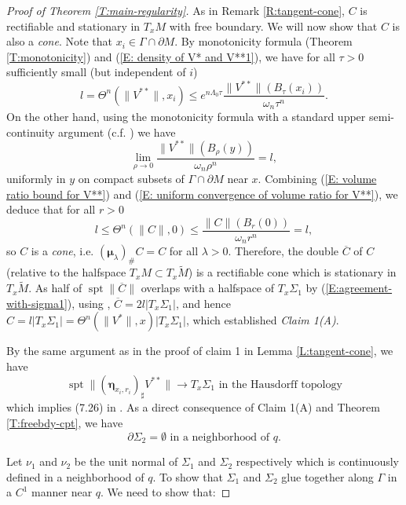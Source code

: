 \documentclass[10pt]{amsart}
\theoremstyle{definition}
\theoremstyle{remark}
\numberwithin{equation}{section}
\newcommand{\A}{\mathcal{A}}
\newcommand{\la}{\lambda}
\newcommand{\La}{\Lambda}
\newcommand{\Si}{\Sigma}
\newcommand{\om}{\omega}
\newcommand{\bmu}{\boldsymbol \mu}
\newcommand{\bleta}{\boldsymbol \eta}
\newcommand{\tM}{\widetilde{M}}
\newcommand{\spt}{\operatorname{spt}}
\begin{document}
\begin{proof}[Proof of Theorem \ref{T:main-regularity}]
As in Remark \ref{R:tangent-cone}, $C$ is rectifiable and stationary in $T_x M$ with free boundary. We will now show that $C$ is also a \emph{cone}. Note that $x_i \in \Gamma \cap \partial M$. By monotonicity formula (Theorem \ref{T:monotonicity}) and (\ref{E: density of V* and V**1}), we have for all $\tau>0$ sufficiently small (but independent of $i$)
\begin{equation}
\label{E: volume ratio bound for V**}
l=\Theta^n(\|V^{**}\|, x_i)\leq e^{n\La_0 \tau}\frac{\|V^{**}\|(B_\tau(x_i))}{\om_n \tau^n}.  
\end{equation}
On the other hand, using the monotonicity formula with a standard upper semi-continuity argument (c.f. \cite[40.6]{Simon}) we have 
\begin{equation}
\label{E: uniform convergence of volume ratio for V**}
\lim_{\rho\to 0} \frac{\|V^{**}\|(B_\rho(y))}{\om_n \rho^n}=l,
\end{equation}
uniformly in $y$ on compact subsets of $\Gamma\cap \partial M$ near $x$.
Combining (\ref{E: volume ratio bound for V**}) and (\ref{E: uniform convergence of volume ratio for V**}), we deduce that for all $r>0$
\[ l\leq \Theta^n(\|C\|, 0)\leq \frac{\|C\|(B_r(0))}{\om_n r^n}=l, \]
so $C$ is a \emph{cone}, i.e. $(\bmu_{\la})_{\#} C= C$ for all $\la>0$. Therefore, the double $\overline{C}$ of $C$ (relative to the halfspace $T_xM \subset T_x \tM$) is a rectifiable cone which is stationary in $T_x \tM$. As half of $\spt \|\overline{C}\|$ overlaps with a halfspace of $T_x \Sigma_1$ by (\ref{E:agreement-with-sigma1}), using \cite[Lemma 7.9]{Pitts}, $\overline{C}=2 l |T_x\Si_1|$, and hence $C=l  |T_x\Si_1|=\Theta^n(\|V^*\|, x)|T_x\Si_1|$, which established \emph{Claim 1(A)}.



By the same argument as in the proof of claim 1 in Lemma \ref{L:tangent-cone}, we have
\begin{equation}
\label{E:Hausdorff-convergence}
\spt \|(\bleta_{x_i,r_i})_\sharp V^{**}\| \to T_x \Sigma_1 \text{ in the Hausdorff topology} 
\end{equation}
which implies (7.26) in \cite{Schoen-Simon81}. As a direct consequence of Claim 1(A) and Theorem \ref{T:freebdy-cpt}, we have
\begin{equation}
\label{E:no-boundary}
\partial \Sigma_2 = \emptyset \text{ in a neighborhood of $q$.}
\end{equation}



Let $\nu_1$ and $\nu_2$ be the unit normal of $\Sigma_1$ and $\Sigma_2$ respectively which is continuously defined in a neighborhood of $q$. To show that $\Sigma_1$ and $\Sigma_2$ glue together along $\Gamma$ in a $C^1$ manner near $q$. We need to show that:


\end{proof}
\end{document}
